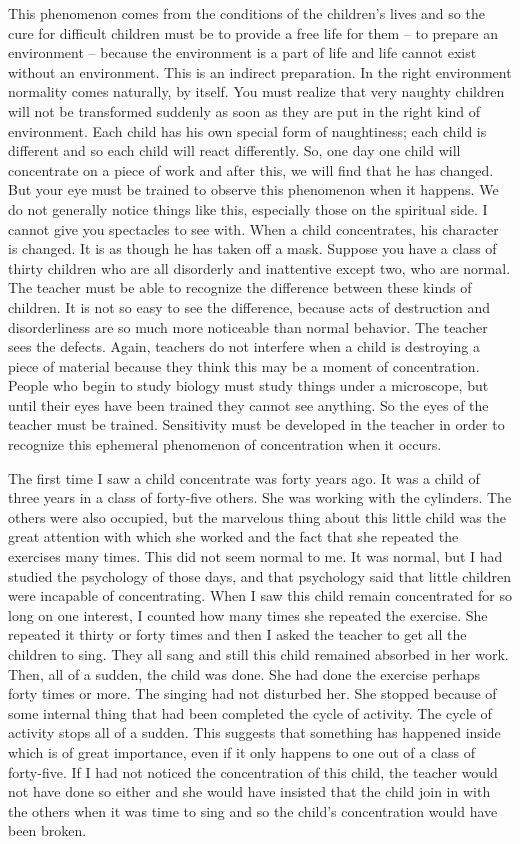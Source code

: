 \documentclass[lang=cn,10pt]{elegantbook}
\begin{document}
This phenomenon comes from the conditions of the children’s
lives and so the cure for difficult children must be to provide a free
life for them – to prepare an environment – because the environment
is a part of life and life cannot exist without an environment. This is
an indirect preparation. In the right environment normality comes
naturally, by itself. You must realize that very naughty children will
not be transformed suddenly as soon as they are put in the right kind
of environment. Each child has his own special form of naughtiness;
each child is different and so each child will react differently. So, one
day one child will concentrate on a piece of work and after this, we
will find that he has changed. But your eye must be trained to
observe this phenomenon when it happens. We do not generally
notice things like this, especially those on the spiritual side. I cannot
give you spectacles to see with. When a child concentrates, his
character is changed. It is as though he has taken off a mask.
Suppose you have a class of thirty children who are all disorderly
and inattentive except two, who are normal. The teacher must be
able to recognize the difference between these kinds of children. It is
not so easy to see the difference, because acts of destruction and
disorderliness are so much more noticeable than normal behavior.
The teacher sees the defects. Again, teachers do not interfere when
a child is destroying a piece of material because they think this may
be a moment of concentration. People who begin to study biology
must study things under a microscope, but until their eyes have been
trained they cannot see anything. So the eyes of the teacher must be
trained. Sensitivity must be developed in the teacher in order to
recognize this ephemeral phenomenon of concentration when it
occurs.

The first time I saw a child concentrate was forty years ago. It
was a child of three years in a class of forty-five others. She was
working with the cylinders. The others were also occupied, but the
marvelous thing about this little child was the great attention with
which she worked and the fact that she repeated the exercises many
times. This did not seem normal to me. It was normal, but I had
studied the psychology of those days, and that psychology said that
little children were incapable of concentrating. When I saw this child
remain concentrated for so long on one interest, I counted how many
times she repeated the exercise. She repeated it thirty or forty times
and then I asked the teacher to get all the children to sing. They all
sang and still this child remained absorbed in her work. Then, all of a
sudden, the child was done. She had done the exercise perhaps
forty times or more. The singing had not disturbed her. She stopped
because of some internal thing that had been completed the cycle of
activity. The cycle of activity stops all of a sudden. This suggests that
something has happened inside which is of great importance, even if
it only happens to one out of a class of forty-five. If I had not noticed
the concentration of this child, the teacher would not have done so
either and she would have insisted that the child join in with the
others when it was time to sing and so the child’s concentration
would have been broken.
\end{document}
